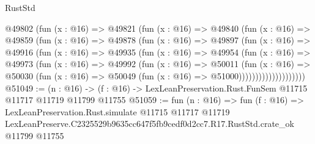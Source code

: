 \begin{lexlean}{RustStd}
\begin{coremodule}
              @49802
                (fun (x : @16) =>
                @49821
                  (fun (x : @16) =>
                  @49840
                    (fun (x : @16) =>
                    @49859
                      (fun (x : @16) =>
                      @49878
                        (fun (x : @16) =>
                        @49897
                          (fun (x : @16) =>
                          @49916
                            (fun (x : @16) =>
                            @49935
                              (fun (x : @16) =>
                              @49954
                                (fun (x : @16) =>
                                @49973
                                  (fun (x : @16) =>
                                  @49992
                                    (fun (x : @16) =>
                                    @50011
                                      (fun (x : @16) =>
                                      @50030
                                        (fun (x : @16) =>
                                        @50049 (fun (x : @16) => @51000))))))))))))))))))))
@51049 := (n : @16) ->
  (f : @16) -> LexLeanPreservation.Rust.FunSem @11715 @11717 @11719 @11799 @11755
@51059 := fun (n : @16) =>
  fun (f : @16) =>
  LexLeanPreservation.Rust.simulate
    @11715
    @11717
    @11719
    LexLeanPreserve.C2325529b9635cc647f5fb9cedf0d2cc7.R17.RustStd.crate_ok
    @11799
    @11755
\end{coremodule}
\end{lexlean}
